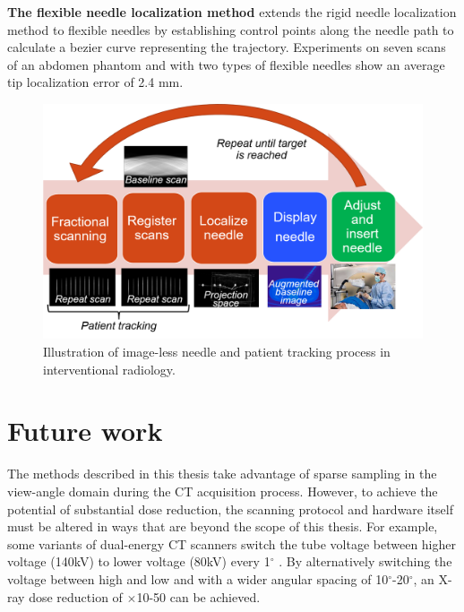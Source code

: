 \textbf{The flexible needle localization method} extends the rigid needle localization method to flexible needles by establishing control points along the needle path to calculate a bezier curve representing the trajectory. Experiments on seven scans of an abdomen phantom and with two types of flexible needles show an average tip localization error of 2.4 mm.

\begin{figure}
    \centering
    \includegraphics[width=15cm]{figures/needle+patient_tracking.png}
    \caption{\small{Illustration of image-less needle and patient tracking process in interventional radiology.}
}
    \label{fig:figures/needle+patient_tracking.png}
\end{figure}

\section{Future work}

The methods described in this thesis take advantage of sparse sampling in the view-angle domain during the CT acquisition process. However, to achieve the potential of substantial dose reduction, the scanning protocol and hardware itself must be altered in ways that are beyond the scope of this thesis. For example, some variants of dual-energy CT scanners switch the tube voltage between higher voltage (140kV) to lower voltage (80kV) every 1$^\circ$ 
\cite{goo2017dual}. By alternatively switching the voltage between high and low and with a wider angular spacing of 10$^\circ$-20$^\circ$, an X-ray dose reduction of $\times$10-50 can be achieved.

